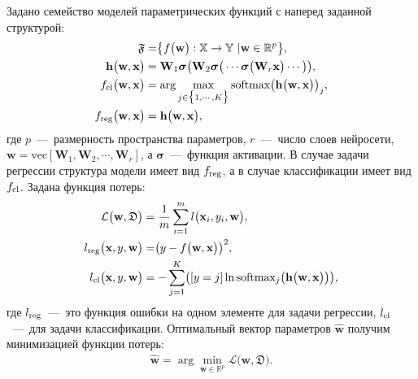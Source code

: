 Задано семейство моделей параметрических функций с наперед заданной структурой:
\[
\label{eq:st:2}
\begin{aligned}
\mathfrak{F} &= \bigr\{f\bigr(\textbf{w}\bigr):\mathbb{X} \to \mathbb{Y}~| \textbf{w} \in \mathbb{R}^{p}\bigr\}, \\ 
\mathbf{h}\bigr(\textbf{w}, \textbf{x}\bigr) &= \textbf{W}_1\bm{\sigma}\bigr(\textbf{W}_2\bm{\sigma}\bigr(\cdots\bm{\sigma}\bigr(\textbf{W}_r\textbf{x}\bigr)\cdots\bigr)\bigr),\\
f_{\text{\text{cl}}}\bigr(\textbf{w}, \textbf{x}\bigr) &= \arg \max_{j \in \bigr\{1,\cdots, K\bigr\}} \text{softmax}\bigr(\mathbf{h}\bigr(\textbf{w}, \textbf{x}\bigr)\bigr)_{j}, \\ 
f_{\text{reg}}\bigr(\textbf{w}, \textbf{x}\bigr) & = \mathbf{h}\bigr(\textbf{w}, \textbf{x}\bigr), 
\end{aligned}
\]
где $p$~---~размерность пространства параметров, $r$~---~число слоев нейросети, $\textbf{w} = \text{vec}[\textbf{W}_1, \textbf{W}_2, \cdots, \textbf{W}_r]$, а $\bm{\sigma}$~---~функция активации. В случае задачи регрессии структура модели имеет вид $f_{\text{\text{reg}}}$, а в случае классификации имеет вид $f_{\text{\text{cl}}}$.
Задана функция потерь:
\[
\label{eq:st:3}
\begin{aligned}
\mathcal{L}\bigr(\textbf{w}, \mathfrak{D}\bigr) &= \frac{1}{m}\sum_{i=1}^{m}l\bigr(\textbf{x}_{i}, y_i, \textbf{w}\bigr),\\
l_{\text{\text{reg}}}\bigr(\textbf{x}, y, \textbf{w}\bigr) &= \bigr(y - f\bigr(\textbf{w}, \textbf{x}\bigr)\bigr)^{2},\\
l_{\text{\text{cl}}}\bigr(\textbf{x}, y, \textbf{w}\bigr) &= -\sum_{j=1}^{K}\bigr([y = j]\ln\text{softmax}_j\bigr(\mathbf{h}\bigr(\textbf{w}, \textbf{x}\bigr)\bigr)\bigr),
\end{aligned}
\]
где $l_{\text{\text{reg}}}$~---~это функция ошибки на одном элементе для задачи регрессии, $l_{\text{\text{cl}}}$~---~для задачи классификации.
Оптимальный вектор параметров $\hat{\textbf{w}}$ получим минимизацией функции потерь:
\[
\label{eq:st:0:1}
\begin{aligned}
\hat{\textbf{w}} = \arg \min_{\textbf{w}\in\mathbb{R}^{p}} \mathcal{L}\bigr(\textbf{w}, \mathfrak{D}\bigr).
\end{aligned}
\]

